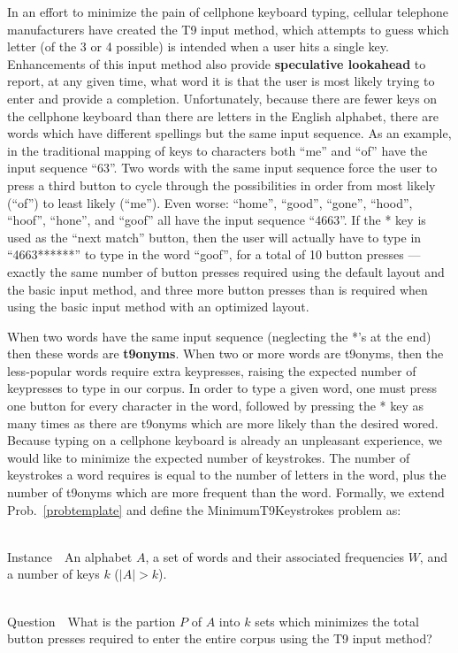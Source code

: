 \documentclass[runningheads]{llncs}
\newcommand{\newword}[1]{{\bf #1}}
\newcommand{\Instance}{{\sc Instance~}}
\newcommand{\Question}{~\\
{\sc Question~}}
\begin{document}
In an effort to minimize the pain of cellphone keyboard typing, cellular
telephone manufacturers have created the T9 input method, which attempts to
guess which letter (of the 3 or 4 possible) is intended when a user hits a
single key.  Enhancements of this input method also provide
\newword{speculative lookahead} to report, at any given time, what word it is
that the user is most likely trying to enter and provide a completion.
Unfortunately, because there are fewer keys on the cellphone keyboard than
there are letters in the English alphabet, there are words which have different
spellings but the same input sequence.  As an example, in the traditional
mapping of keys to characters both ``me'' and ``of'' have the input sequence
``63''.  Two words with the same input sequence force the user to press a third
button to cycle through the possibilities in order from most likely (``of'') to
least likely (``me'').  Even worse: ``home'', ``good'', ``gone'', ``hood'',
``hoof'', ``hone'', and ``goof'' all have the input sequence ``4663''.  If
the * key is used as the ``next match'' button, then the user will actually
have to type in ``4663******'' to type in the word ``goof'', for a total of 10
button presses --- exactly the same number of button presses required using the
default layout and the basic input method, and three more button presses than
is required when using the basic input method with an optimized layout.

When two words have the same input sequence (neglecting the *'s at the end)
then these words are \newword{t9onyms}.  When two or more words are t9onyms,
then the less-popular words require extra keypresses, raising the expected
number of keypresses to type in our corpus.  In order to type a given word, one
must press one button for every character in the word, followed by pressing
the * key as many times as there are t9onyms which are more likely than the
desired wored.  Because typing on a cellphone keyboard is already an unpleasant
experience, we would like to minimize the expected number of keystrokes.  The
number of keystrokes a word requires is equal to the number of letters in the
word, plus the number of t9onyms which are more frequent than the word.
Formally, we extend Prob.~\ref{probtemplate} and define the {\sc
MinimumT9Keystrokes} problem as:

\begin{prob}~\\
\label{thm:minstrokes}
\Instance\ An alphabet $A$, a set of words and their associated frequencies $W$, and a number of keys $k$ ($|A| > k$).

\Question\ What is the partion $P$ of $A$ into $k$ sets which minimizes the total button presses required to enter the entire corpus using the T9 input method?
\end{prob}
\end{document}
